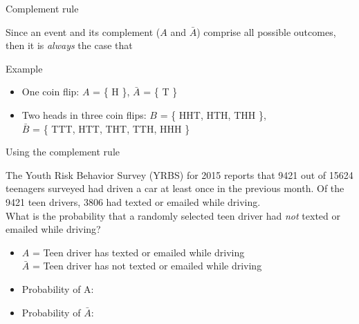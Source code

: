 \documentclass[xcolor=table, aspectratio=169, bigger, handout]{beamer}
\begin{document}
\begin{frame}{Complement rule }
\begin{block}{}
Since an event and its complement ($A$ and $\bar A$) comprise all possible outcomes, then it is \emph{always} the case that\\
\end{block}

\pause

\begin{exampleblock}{Example}
\begin{itemize}
\item One coin flip: $A$ = \{ H \}, $\bar A$ = \{ T \}\\
\pause
{}

\pause
\item Two heads in three coin flips: $B$ = \{ HHT, HTH, THH \},\\ $\bar B$ = \{ TTT, HTT, THT, TTH, HHH \}\\
\pause
{}
\end{itemize}
\end{exampleblock}
\end{frame}

\begin{frame}{Using the complement rule}
\begin{exampleblock}{}
The Youth Risk Behavior Survey (YRBS) for 2015 reports that 9421 out of 15624 teenagers surveyed had driven a car at least once in the previous month. Of the 9421 teen drivers, 3806 had texted or emailed while driving. \\
\medskip
What is the probability that a randomly selected teen driver had \emph{not} texted or emailed while driving? 

\begin{itemize}
\pause
\item $A$ = Teen driver has texted or emailed while driving\\
$\bar A$ = Teen driver has not texted or emailed while driving
\pause
\item Probability of A:\\
\pause
\item Probability of $\bar A$:\\
\end{itemize}
\end{exampleblock}
\end{frame}
\end{document}
